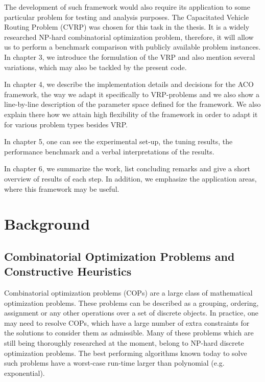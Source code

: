 \documentclass[12pt,a4paper,oneside]{book}
\begin{document}
The development of such framework would also require its application to some particular problem for testing and analysis purposes. The Capacitated Vehicle Routing Problem (CVRP) was chosen for this task in the thesis. It is a widely researched NP-hard combinatorial optimization problem, therefore, it will allow us to perform a benchmark comparison with publicly available problem instances. In chapter 3, we introduce the formulation of the VRP and also mention several variations, which may also be tackled by the present code.

In chapter 4, we describe the implementation details and decisions for the ACO framework, the way we adapt it specifically to VRP-problems and we also show a line-by-line description of the parameter space defined for the framework. We also explain there how we attain high flexibility of the framework in order to adapt it for various problem types besides VRP.

In chapter 5, one can see the experimental set-up, the tuning results, the performance benchmark and a verbal interpretations of the results.

In chapter 6, we summarize the work, list concluding remarks and give a short overview of results of each step. In addition, we emphasize the application areas, where this framework may be useful. 

\chapter{Background}

\section{Combinatorial Optimization Problems and Constructive Heuristics}

Combinatorial optimization problems (COPs) are a large class of mathematical optimization problems. These problems can be described as a grouping, ordering, assignment or any other operations over a set of discrete objects. In practice, one may need to resolve COPs, which have a large number of extra constraints for the solutions to consider them as admissible. Many of these problems which are still being thoroughly researched at the moment, belong to NP-hard discrete optimization problems. The best performing algorithms known today to solve such problems have a worst-case run-time larger than polynomial (e.g. exponential).

\noindent{}
\end{document}
